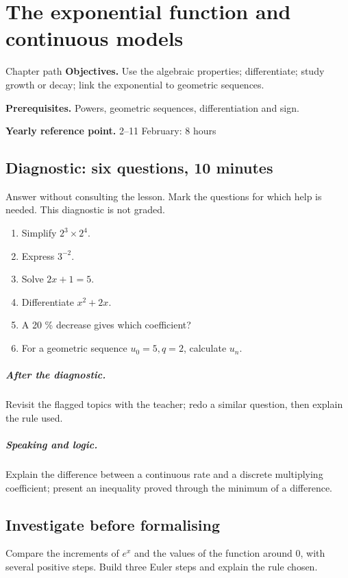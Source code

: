 \chapter{The exponential function and continuous models}\label{C09}
\begin{repere}{Chapter path}
\textbf{Objectives.} Use the algebraic properties; differentiate; study growth or decay; link the exponential to geometric sequences.

\textbf{Prerequisites.} Powers, geometric sequences, differentiation and sign.

\textbf{Yearly reference point.} 2--11 February: 8 hours\end{repere}
\section*{Diagnostic: six questions, 10 minutes}\label{C09-D}
Answer without consulting the lesson. Mark the questions for which help is needed. This diagnostic is not graded.
\begin{enumerate}
\item Simplify $2^3\times2^4$.
\item Express $3^{-2}$.
\item Solve $2x+1=5$.
\item Differentiate $x^2+2x$.
\item A 20 \% decrease gives which coefficient?
\item For a geometric sequence $u_0=5,q=2$, calculate $u_n$.
\end{enumerate}
\paragraph{After the diagnostic.} Revisit the flagged topics with the teacher; redo a similar question, then explain the rule used.
\paragraph{Speaking and logic.} Explain the difference between a continuous rate and a discrete multiplying coefficient; present an inequality proved through the minimum of a difference.
\clearpage
\section*{Investigate before formalising}\label{C09-RECH}
Compare the increments of $e^x$ and the values of the function around 0, with several positive steps. Build three Euler steps and explain the rule chosen.
